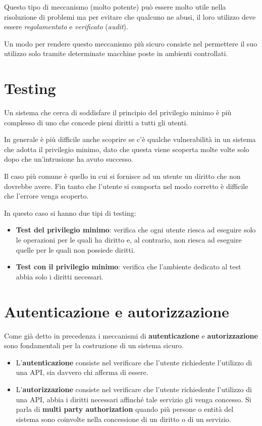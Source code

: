 Questo tipo di meccanismo (molto potente) può essere molto utile nella risoluzione di problemi ma per evitare che
qualcuno ne abusi, il loro utilizzo deve essere \emph{regolamentato} e \emph{verificato} (\emph{audit}).

Un modo per rendere questo meccanismo più sicuro consiste nel permettere il suo utilizzo solo tramite determinate
macchine poste in ambienti controllati.

\section{Testing}
Un sistema che cerca di soddisfare il principio del privilegio minimo è più complesso di uno che concede pieni diritti
a tutti gli utenti.

In generale è più difficile anche scoprire se c'è qualche vulnerabilità in un sistema che adotta il privilegio minimo,
dato che questa viene scoperta molte volte solo dopo che un'intrusione ha avuto successo.

Il caso più comune è quello in cui si fornisce ad un utente un diritto che non dovrebbe avere. Fin tanto che l'utente
si comporta nel modo corretto è difficile che l'errore venga scoperto.

In questo caso si hanno due tipi di testing:
\begin{itemize}
	\item \textbf{Test del privilegio minimo}: verifica che ogni utente riesca ad eseguire solo le operazioni per le
	      quali ha diritto e, al contrario, non riesca ad eseguire quelle per le quali non possiede diritti.
	\item \textbf{Test con il privilegio minimo}: verifica che l'ambiente dedicato al test abbia solo i diritti
	      necessari.
\end{itemize}

\section{Autenticazione e autorizzazione}
Come già detto in precedenza i meccanismi di \textbf{autenticazione} e \textbf{autorizzazione} sono fondamentali per
la costruzione di un sistema sicuro.
\begin{itemize}
	\item L'\textbf{autenticazione} consiste nel verificare che l'utente richiedente l'utilizzo di una API, sia davvero
	      chi afferma di essere.
	\item L'\textbf{autorizzazione} consiste nel verificare che l'utente richiedente l'utilizzo di una API, abbia i
	      diritti necessari affinché tale servizio gli venga concesso. Si parla di \textbf{multi party authorization}
	      quando più persone o entità del sistema sono coinvolte nella concessione di un diritto o di un servizio.
\end{itemize}

